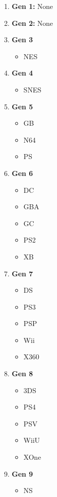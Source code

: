 \begin{enumerate}
\item \textbf{Gen 1:} None
\item \textbf{Gen 2:} None
\item \textbf{Gen 3}
  \begin{itemize}
  \item NES
  \end{itemize}
\item \textbf{Gen 4}
  \begin{itemize}
  \item SNES
  \end{itemize}
\item \textbf{Gen 5}
  \begin{itemize}
  \item GB
  \item N64
  \item PS
  \end{itemize}
\item \textbf{Gen 6}
  \begin{itemize}
  \item DC
  \item GBA
  \item GC
  \item PS2
  \item XB
  \end{itemize}
\item \textbf{Gen 7}
  \begin{itemize}
  \item DS
  \item PS3
  \item PSP
  \item Wii
  \item X360
  \end{itemize}
\item \textbf{Gen 8}
  \begin{itemize}
  \item 3DS
  \item PS4
  \item PSV
  \item WiiU
  \item XOne
  \end{itemize}
\item \textbf{Gen 9}
  \begin{itemize}
  \item NS
  \end{itemize}
\end{enumerate}

